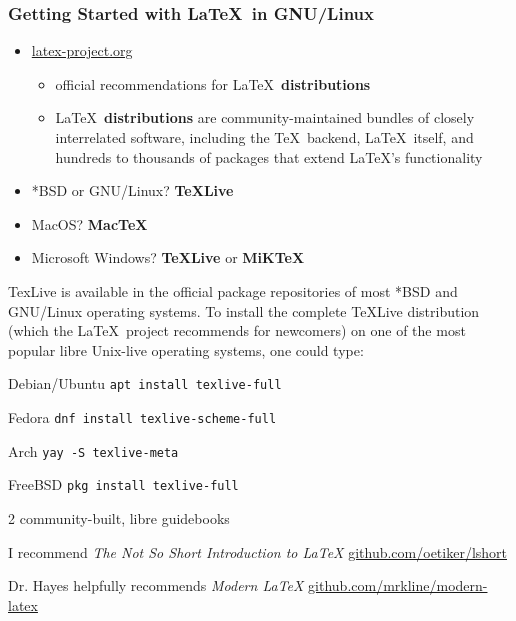 \documentclass{beamer}
\begin{document}
\begin{frame}
	\frametitle[Starting \LaTeX]{Getting Started with \LaTeX\ in GNU/Linux}
\begin{itemize}
	\item \href{https://www.latex-project.org/}{latex-project.org}
		\begin{itemize}
			\item official recommendations for \LaTeX\ \textbf{distributions}
			\item \LaTeX\ \textbf{distributions} are community-maintained bundles of closely interrelated software, including the \TeX\ backend, \LaTeX\ itself, and hundreds to thousands of packages that extend \LaTeX's functionality
		\end{itemize}
	\item *BSD or GNU/Linux? 
	\textbf{TeXLive}
	\item MacOS? 
	\textbf{MacTeX}
	\item Microsoft Windows? 
\textbf{TeXLive} or \textbf{MiKTeX}
\end{itemize}
\end{frame}

\begin{frame}
	TexLive is available in the official package repositories of most *BSD and GNU/Linux operating systems. To install the complete TeXLive distribution (which the \LaTeX\ project recommends for newcomers) on one of the most popular libre Unix-live operating systems, one could type: \break
	
	Debian/Ubuntu \break
	\texttt{apt install texlive-full} \break
	
	Fedora \break
	\texttt{dnf install texlive-scheme-full} \break
	
	Arch \break
	\texttt{yay -S texlive-meta} \break
	
	FreeBSD \break
	\texttt{pkg install texlive-full}
\end{frame}

\begin{frame}
	
	2 community-built, libre guidebooks \break
	
	I recommend \break \emph{The Not So Short Introduction to \LaTeX} \break
	\href{https://github.com/oetiker/lshort}{github.com/oetiker/lshort} \break
	
	Dr. Hayes helpfully recommends \break \emph{Modern \LaTeX} \break
	\href{https://github.com/mrkline/modern-latex}{github.com/mrkline/modern-latex}
\end{frame}
\end{document}
